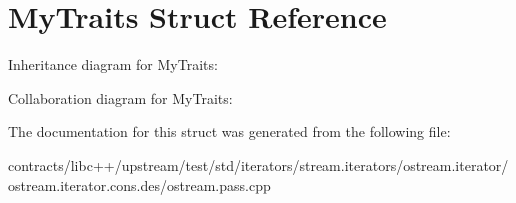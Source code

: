 \hypertarget{struct_my_traits}{}\section{My\+Traits Struct Reference}
\label{struct_my_traits}


Inheritance diagram for My\+Traits\+:


Collaboration diagram for My\+Traits\+:


The documentation for this struct was generated from the following file\+:\begin{DoxyCompactItemize}
\item 
contracts/libc++/upstream/test/std/iterators/stream.\+iterators/ostream.\+iterator/ostream.\+iterator.\+cons.\+des/ostream.\+pass.\+cpp\end{DoxyCompactItemize}
